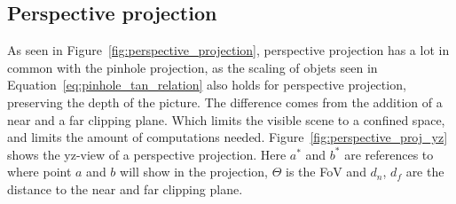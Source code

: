 \subsection{Perspective projection}

As seen in Figure~\ref{fig:perspective_projection}, perspective projection has a lot in common with the pinhole projection, as the scaling of objets seen in Equation~\eqref{eq:pinhole_tan_relation} also holds for perspective projection, preserving the depth of the picture. The difference comes from the addition of a near and a far clipping plane. Which limits the visible scene to a confined space, and limits the amount of computations needed. Figure~\ref{fig:perspective_proj_yz} shows the yz-view of a perspective projection. Here $a^*$ and $b^*$ are references to where point $a$ and $b$ will show in the projection, $\Theta$ is the FoV and $d_n$, $d_f$ are the distance to the near and far clipping plane.

